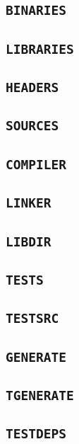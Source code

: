 \documentclass{article}
\begin{document}
\subsection{\texttt{BINARIES}}

\subsection{\texttt{LIBRARIES}}

\subsection{\texttt{HEADERS}}

\subsection{\texttt{SOURCES}}

\subsection{\texttt{COMPILER}}

\subsection{\texttt{LINKER}}

\subsection{\texttt{LIBDIR}}

\subsection{\texttt{TESTS}}

\subsection{\texttt{TESTSRC}}

\subsection{\texttt{GENERATE}}

\subsection{\texttt{TGENERATE}}

\subsection{\texttt{TESTDEPS}}
\end{document}
